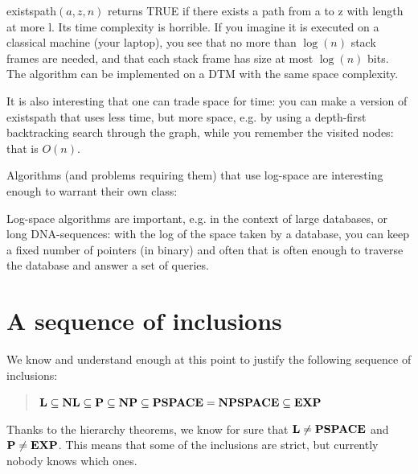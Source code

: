 \newpage
\begin{algorithmic}
\EndIf
{}
\EndIf


   \EndIf
\EndFor
{}
\EndFunction
\end{algorithmic}

{\sc existspath}$(a,z,n)$ returns TRUE if there exists a path from a
to z with length at more l. Its time complexity is horrible. If you
imagine it is executed on a classical machine (your laptop), you see
that no more than $\log(n)$ stack frames are needed, and that each
stack frame has size at most $\log(n)$ bits. The algorithm can be
implemented on a DTM with the same space complexity.

It is also interesting that one can trade space for time: you can make
a version of \mbox{{\sc existspath}} that uses less time, but more
space, e.g. by using a depth-first backtracking search through the
graph, while you remember the visited nodes: that is $O(n)$.

Algorithms (and problems requiring them) that use log-space are
interesting enough to warrant their own class:



Log-space algorithms are important, e.g. in the context of large
databases, or long DNA-sequences: with the log of the space taken by a
database, you can keep a fixed number of pointers (in binary) and
often that is often enough to traverse the database and answer a
set of queries.

\newpage
\section{A sequence of inclusions}

We know and understand enough at this point to justify the following
sequence of inclusions:

\begin{verse}
${\bf L} \subseteq {\bf NL} \subseteq {\bf P} \subseteq {\bf NP} \subseteq {\bf PSPACE}
  = {\bf NPSPACE} \subseteq {\bf EXP}$
\end{verse}

Thanks to the hierarchy theorems, we know for sure that 
${\bf L} \neq {\bf PSPACE}$ and ${\bf P} \neq {\bf EXP}$. This means that some of the
inclusions are strict, but currently nobody knows which ones.


